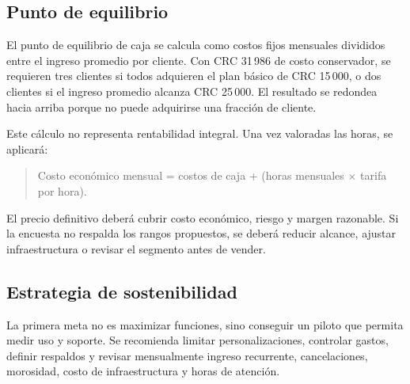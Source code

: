 \subsection{Punto de equilibrio}

El punto de equilibrio de caja se calcula como costos fijos mensuales divididos
entre el ingreso promedio por cliente. Con CRC 31\,986 de costo conservador, se
requieren tres clientes si todos adquieren el plan básico de CRC 15\,000, o dos
clientes si el ingreso promedio alcanza CRC 25\,000. El resultado se redondea
hacia arriba porque no puede adquirirse una fracción de cliente.

Este cálculo no representa rentabilidad integral. Una vez valoradas las horas,
se aplicará:

\begin{quote}
Costo económico mensual = costos de caja + (horas mensuales $\times$ tarifa por hora).
\end{quote}

El precio definitivo deberá cubrir costo económico, riesgo y margen razonable.
Si la encuesta no respalda los rangos propuestos, se deberá reducir alcance,
ajustar infraestructura o revisar el segmento antes de vender.

\subsection{Estrategia de sostenibilidad}

La primera meta no es maximizar funciones, sino conseguir un piloto que permita
medir uso y soporte. Se recomienda limitar personalizaciones, controlar gastos,
definir respaldos y revisar mensualmente ingreso recurrente, cancelaciones,
morosidad, costo de infraestructura y horas de atención.

